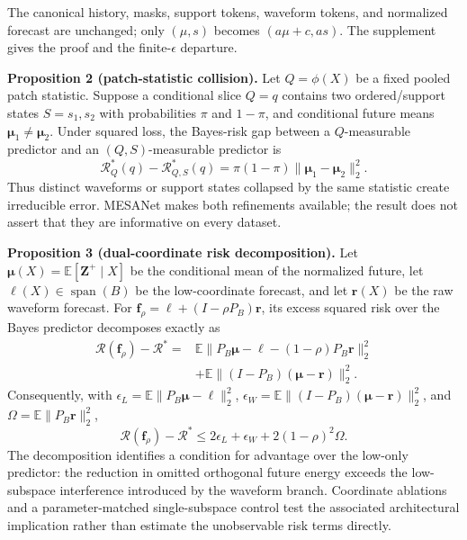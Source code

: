 The canonical history, masks, support tokens, waveform tokens, and normalized
forecast are unchanged; only $(\mu,s)$ becomes $(a\mu+c,as)$. The supplement
gives the proof and the finite-$\epsilon$ departure.

\textbf{Proposition 2 (patch-statistic collision).}
Let $Q=\phi(X)$ be a fixed pooled patch statistic. Suppose a conditional slice
$Q=q$ contains two ordered/support states $S=s_1,s_2$ with probabilities
$\pi$ and $1-\pi$, and conditional future means $\boldsymbol\mu_1\neq
\boldsymbol\mu_2$. Under squared loss, the Bayes-risk gap between a
$Q$-measurable predictor and an $(Q,S)$-measurable predictor is
\begin{equation}
\mathcal R_Q^*(q)-\mathcal R_{Q,S}^*(q)
=\pi(1-\pi)\|\boldsymbol\mu_1-\boldsymbol\mu_2\|_2^2.
\label{eq:collision}
\end{equation}
Thus distinct waveforms or support states collapsed by the same statistic
create irreducible error. MESANet makes both refinements available; the result
does not assert that they are informative on every dataset.

\textbf{Proposition 3 (dual-coordinate risk decomposition).}
Let $\boldsymbol\mu(X)=\mathbb E[\mathbf Z^+\mid X]$ be the conditional mean
of the normalized future, let $\boldsymbol\ell(X)\in\operatorname{span}(B)$
be the low-coordinate forecast, and let $\mathbf r(X)$ be the raw waveform
forecast. For
$\mathbf f_\rho=\boldsymbol\ell+(I-\rho P_B)\mathbf r$, its excess squared
risk over the Bayes predictor decomposes exactly as
\begin{align}
\mathcal R(\mathbf f_\rho)-\mathcal R^*
={}&\mathbb E\|P_B\boldsymbol\mu-\boldsymbol\ell
 -(1-\rho)P_B\mathbf r\|_2^2 \nonumber\\
&+\mathbb E\|(I-P_B)(\boldsymbol\mu-\mathbf r)\|_2^2.
\label{eq:risk-decomposition}
\end{align}
Consequently, with
$\epsilon_L=\mathbb E\|P_B\boldsymbol\mu-\boldsymbol\ell\|_2^2$,
$\epsilon_W=\mathbb E\|(I-P_B)(\boldsymbol\mu-\mathbf r)\|_2^2$, and
$\Omega=\mathbb E\|P_B\mathbf r\|_2^2$,
\begin{equation}
\mathcal R(\mathbf f_\rho)-\mathcal R^*
\leq 2\epsilon_L+\epsilon_W+2(1-\rho)^2\Omega.
\label{eq:risk-bound}
\end{equation}
The decomposition identifies a condition for advantage over the low-only predictor: the reduction
in omitted orthogonal future energy exceeds the low-subspace interference
introduced by the waveform branch. Coordinate ablations and a
parameter-matched single-subspace control test the associated architectural
implication rather than estimate the unobservable risk terms directly.

